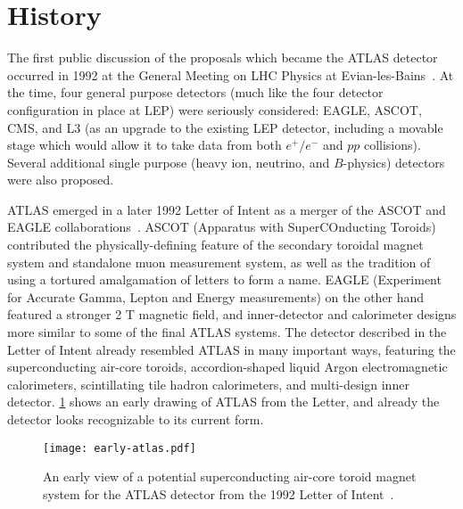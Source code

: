 



\section{History}

The first public discussion of the proposals which became the ATLAS detector occurred in 1992 at the General Meeting on LHC Physics at Evian-les-Bains~\cite{Evian,EvianCourier}. At the time, four general purpose detectors (much like the four detector configuration in place at LEP) were seriously considered: EAGLE, ASCOT, CMS, and L3 (as an upgrade to the existing LEP detector, including a movable stage which would allow it to take data from both $e^+/e^-$ and $pp$ collisions). Several additional single purpose (heavy ion, neutrino, and $B$-physics) detectors were also proposed.

ATLAS emerged in a later 1992 Letter of Intent as a merger of the ASCOT and EAGLE collaborations~\cite{ATLAS-LoI}. ASCOT (Apparatus with SuperCOnducting Toroids) contributed the physically-defining feature of the secondary toroidal magnet system and standalone muon measurement system, as well as the tradition of using a tortured amalgamation of letters to form a name. EAGLE (Experiment for Accurate Gamma, Lepton and Energy measurements) on the other hand featured a stronger 2 T magnetic field, and inner-detector and calorimeter designs more similar to some of the final ATLAS systems. The detector described in the Letter of Intent already resembled ATLAS in many important ways, featuring the superconducting air-core toroids, accordion-shaped liquid Argon electromagnetic calorimeters, scintillating tile hadron calorimeters, and multi-design inner detector. \ref{fig:detector:earlyatlas} shows an early drawing of ATLAS from the Letter, and already the detector looks recognizable to its current form.



\begin{figure}
\centering
\texttt{[image: early-atlas.pdf]}
\label{fig:detector:earlyatlas}
\caption{An early view of a potential superconducting air-core toroid magnet system for the ATLAS detector from the 1992 Letter of Intent~\cite{ATLAS-LoI}.}
\end{figure}

